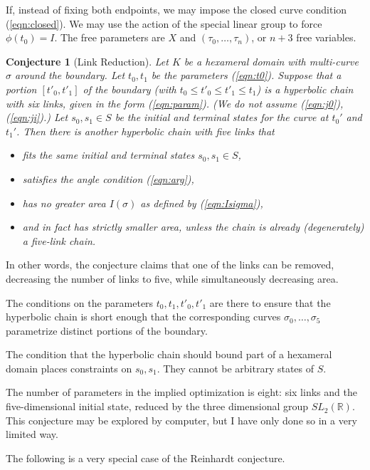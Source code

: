 \documentclass[11pt]{amsart}
\newtheorem{conj}[equation]{Conjecture}
\newcommand{\ring}[1]{\mathbb{#1}}
\def\rR{{\ring{R}}}
\def\ta{{\tau}}
\begin{document}
If, instead of fixing both endpoints, we may impose the closed
curve condition (\ref{eqn:closed}). We may use the action of
the special linear group to force $\phi(t_0)=I$.  The free
parameters are $X$ and $(\ta_0,\ldots,\ta_n)$, or $n+3$ free
variables.  



\begin{conj}[Link Reduction] \label{conj:defrag} Let $K$ be a
  hexameral domain with multi-curve $\sigma$ around the boundary.  Let
  $t_0,t_1$ be the parameters (\ref{eqn:t0}).  Suppose that a portion
  $[t'_0,t'_1]$ of the boundary (with $t_0\le t'_0\le t'_1\le t_1$) is
  a hyperbolic chain with six links, given in the form
  (\ref{eqn:param}).  (We do not assume (\ref{eqn:j0}),
  (\ref{eqn:ji}).)  Let $s_0,s_1\in S$ be the initial and terminal
  states for the curve at $t_0'$ and $t_1'$.  Then there is
  another hyperbolic chain with five links that
\begin{itemize}
\item fits the same initial and terminal states $s_0,s_1\in S$,
\item satisfies the angle condition (\ref{eqn:arg}),
\item has no greater area $I(\sigma)$ as defined by (\ref{eqn:Isigma}),
\item and in fact has strictly smaller area, unless the chain is already (degenerately) a 
five-link chain.
\end{itemize}
\end{conj}

In other words, the conjecture claims that one of the links can
be removed, decreasing the number of links to five, while
simultaneously decreasing area.

The conditions on the parameters $t_0,t_1,t'_0,t'_1$ are there to
ensure that the hyperbolic chain is short enough that the
corresponding curves $\sigma_0,\ldots,\sigma_5$ parametrize distinct
portions of the boundary.

The condition that the hyperbolic chain should bound part of a hexameral
domain places constraints on $s_0,s_1$.  They cannot be arbitrary
states of $S$.

The number of parameters in the implied optimization is eight: six
links and the five-dimensional initial state, reduced by the three
dimensional group $SL_2(\rR)$.  This conjecture may be explored by
computer, but I have only done so in a very limited way.

\bigskip

The following is a very special case of the Reinhardt conjecture.
\end{document}
